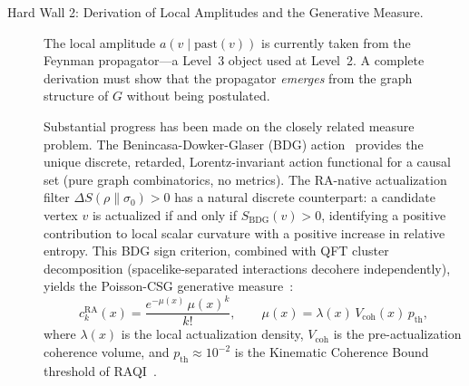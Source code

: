 \documentclass[11pt,a4paper]{article}
\theoremstyle{plain}
\theoremstyle{definition}
\theoremstyle{remark}
\begin{document}
\begin{description}
  \item[Hard Wall 2: Derivation of Local Amplitudes and the Generative Measure.]
  The local amplitude $a(v \mid \mathrm{past}(v))$ is currently taken from
  the Feynman propagator---a Level~3 object used at Level~2. A complete
  derivation must show that the propagator \emph{emerges} from the graph
  structure of $G$ without being postulated.

  Substantial progress has been made on the closely related measure problem.
  The Benincasa-Dowker-Glaser (BDG) action~\citep{Benincasa2010} provides the
  unique discrete, retarded, Lorentz-invariant action functional for a causal
  set (pure graph combinatorics, no metrics). The RA-native actualization filter
  $\Delta S(\rho\|\sigma_0) > 0$ has a natural discrete counterpart: a candidate
  vertex $v$ is actualized if and only if $S_{\mathrm{BDG}}(v) > 0$, identifying
  a positive contribution to local scalar curvature with a positive increase in
  relative entropy. This BDG sign criterion, combined with QFT cluster
  decomposition (spacelike-separated interactions decohere independently), yields
  the Poisson-CSG generative measure~\citep{Sandeman2026b}:
  \begin{equation}
    c_k^{\mathrm{RA}}(x) = \frac{e^{-\mu(x)}\,\mu(x)^k}{k!},
    \qquad
    \mu(x) = \lambda(x)\,V_{\mathrm{coh}}(x)\,p_{\mathrm{th}},
  \end{equation}
  where $\lambda(x)$ is the local actualization density, $V_{\mathrm{coh}}$ is
  the pre-actualization coherence volume, and $p_{\mathrm{th}} \approx 10^{-2}$
  is the Kinematic Coherence Bound threshold of RAQI~\citep{Sandeman2026d}.


\end{description}
\end{document}
